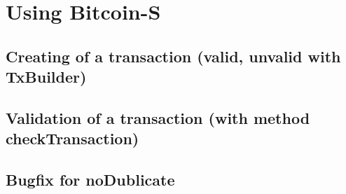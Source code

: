 \chapter{Using Bitcoin-S}
\label{chap:using_bitcoins}

\section{Creating of a transaction (valid, unvalid with TxBuilder)}

\section{Validation of a transaction (with method checkTransaction)}

\section{{Bugfix for noDublicate}}